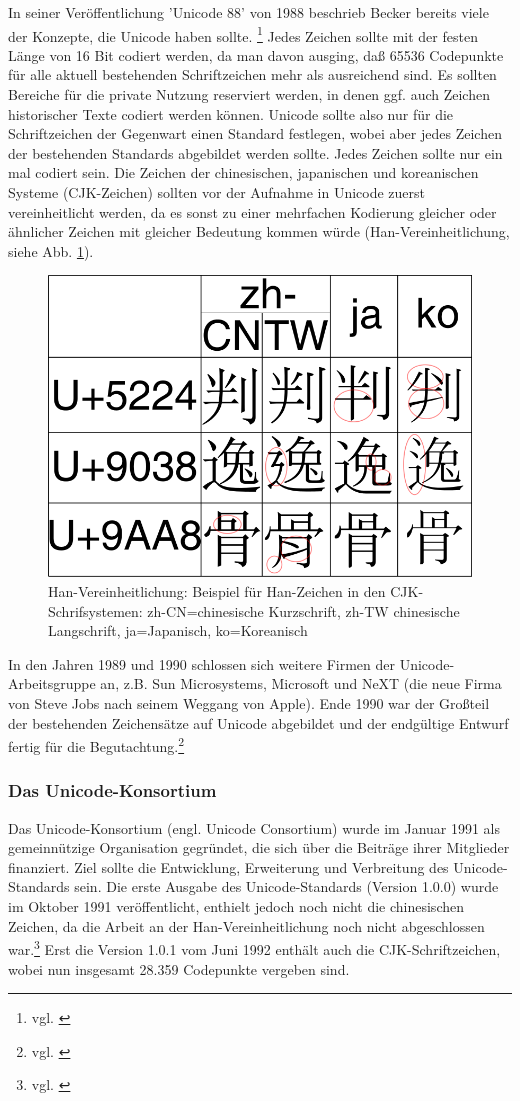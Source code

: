 In seiner Veröffentlichung 'Unicode 88' von 1988 beschrieb Becker bereits viele der Konzepte, die Unicode haben sollte. \footnote{vgl. \cite{Becker88}}
Jedes Zeichen sollte mit der festen Länge von 16 Bit codiert werden, da man davon ausging, daß 65536 Codepunkte für alle aktuell bestehenden Schriftzeichen mehr als ausreichend sind. Es sollten Bereiche für die private Nutzung reserviert werden, in denen ggf. auch Zeichen historischer Texte codiert werden können. Unicode sollte also nur für die Schriftzeichen der Gegenwart einen Standard festlegen, wobei aber jedes Zeichen der bestehenden Standards abgebildet werden sollte. Jedes Zeichen sollte nur ein mal codiert sein. Die Zeichen der chinesischen, japanischen und koreanischen Systeme (CJK-Zeichen) sollten vor der Aufnahme in Unicode zuerst vereinheitlicht werden, da es sonst zu einer mehrfachen Kodierung gleicher oder ähnlicher Zeichen mit gleicher Bedeutung kommen würde (Han-Vereinheitlichung, siehe Abb. \ref{CJK}).

\begin{figure}[h]
\centering
\includegraphics[width=.45\textwidth]{img/pan-mien-gu.png}
\caption[Han-Vereinheitlichung: Han-Zeichen in CJK-Schriften]{Han-Vereinheitlichung: Beispiel für Han-Zeichen in den CJK-Schrifsystemen: zh-CN=chinesische Kurzschrift, zh-TW chinesische Langschrift, ja=Japanisch, ko=Koreanisch \footnotemark}
\label{CJK}
\end{figure}

In den Jahren 1989 und 1990 schlossen sich weitere Firmen der Unicode-Arbeitsgruppe an, z.B.  Sun Microsystems, Microsoft und NeXT (die neue Firma von Steve Jobs nach seinem Weggang von Apple). Ende 1990 war der Großteil der bestehenden Zeichensätze auf Unicode abgebildet und der endgültige Entwurf fertig für die Begutachtung.\footnote{vgl. \cite{UCC}}


\subsubsection{Das Unicode-Konsortium}
Das Unicode-Konsortium (engl. Unicode Consortium) wurde im Januar 1991 als gemeinnützige Organisation gegründet, die sich über die Beiträge ihrer Mitglieder finanziert. Ziel sollte die Entwicklung, Erweiterung und Verbreitung des Unicode-Standards sein. Die erste Ausgabe des Unicode-Standards (Version 1.0.0) wurde im Oktober 1991 veröffentlicht, enthielt jedoch noch nicht die chinesischen Zeichen, da die Arbeit an der Han-Vereinheitlichung noch nicht abgeschlossen war.\footnote{vgl. \cite{UC2014E}}
Erst die Version 1.0.1 vom Juni 1992 enthält auch die CJK-Schriftzeichen, wobei nun insgesamt 28.359 Codepunkte vergeben sind.


